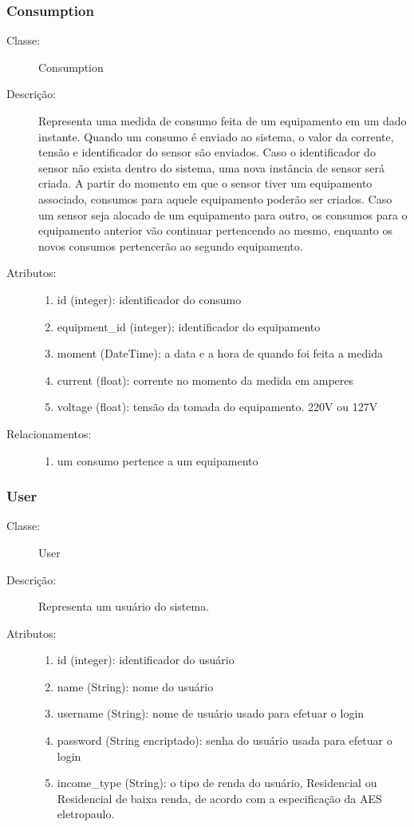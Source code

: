 \subsubsection{Consumption}
\begin{description}
  \item[Classe:] Consumption
  \item[Descrição:] Representa uma medida de consumo feita de um equipamento em um dado instante. Quando um consumo é enviado ao sistema, o valor da corrente, tensão e identificador do sensor são enviados. Caso o identificador do sensor não exista dentro do sistema, uma nova instância de sensor será criada. A partir do momento em que o sensor tiver um equipamento associado, consumos para aquele equipamento poderão ser criados. Caso um sensor seja alocado de um equipamento para outro, os consumos para o equipamento anterior vão continuar pertencendo ao mesmo, enquanto os novos consumos pertencerão ao segundo equipamento.
  \item[Atributos:] \hfill
    \begin{enumerate}
      \item id (integer): identificador do consumo
      \item equipment\_id (integer): identificador do equipamento
      \item moment (DateTime): a data e a hora de quando foi feita a medida
      \item current (float): corrente no momento da medida em amperes
      \item voltage (float): tensão da tomada do equipamento. 220V ou 127V
    \end{enumerate}
  \item[Relacionamentos:] \hfill
    \begin{enumerate}
      \item um consumo pertence a um equipamento
    \end{enumerate}
\end{description} 
%
\subsubsection{User}
\begin{description}
  \item[Classe:] User
  \item[Descrição:] Representa um usuário do sistema. 
  \item[Atributos:] \hfill
    \begin{enumerate}
      \item id (integer): identificador do usuário
      \item name (String):  nome do usuário
      \item username (String): nome de usuário usado para efetuar o login
      \item password (String encriptado): senha do usuário usada para efetuar o login
        \item income\_type (String): o tipo de renda do usuário, Residencial ou Residencial de baixa renda, de acordo com a especificação da AES eletropaulo.
    \end{enumerate}
\end{description} 
%
